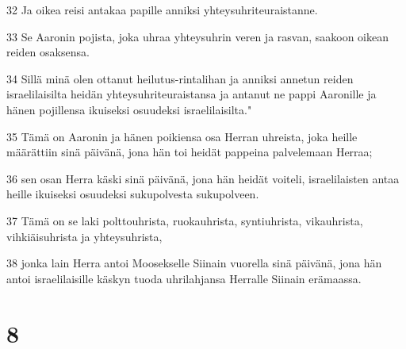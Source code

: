 \par 32 Ja oikea reisi antakaa papille anniksi yhteysuhriteuraistanne.
\par 33 Se Aaronin pojista, joka uhraa yhteysuhrin veren ja rasvan, saakoon oikean reiden osaksensa.
\par 34 Sillä minä olen ottanut heilutus-rintalihan ja anniksi annetun reiden israelilaisilta heidän yhteysuhriteuraistansa ja antanut ne pappi Aaronille ja hänen pojillensa ikuiseksi osuudeksi israelilaisilta."
\par 35 Tämä on Aaronin ja hänen poikiensa osa Herran uhreista, joka heille määrättiin sinä päivänä, jona hän toi heidät pappeina palvelemaan Herraa;
\par 36 sen osan Herra käski sinä päivänä, jona hän heidät voiteli, israelilaisten antaa heille ikuiseksi osuudeksi sukupolvesta sukupolveen.
\par 37 Tämä on se laki polttouhrista, ruokauhrista, syntiuhrista, vikauhrista, vihkiäisuhrista ja yhteysuhrista,
\par 38 jonka lain Herra antoi Moosekselle Siinain vuorella sinä päivänä, jona hän antoi israelilaisille käskyn tuoda uhrilahjansa Herralle Siinain erämaassa.

\chapter{8}

